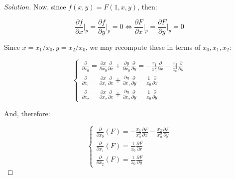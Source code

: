\documentclass[10pt]{article}
\begin{document}
\begin{proof}[Solution]





Now, since $f(x,y) = F(1,x,y)$, then:

$$ \frac{\partial f}{\partial x}\bigg|_{p}= \frac{\partial f}{\partial y}\bigg|_{p} = 0 \iff \frac{\partial F}{\partial x}\bigg|_{p}= \frac{\partial F}{\partial y}\bigg|_{p} = 0$$

Since $x = x_1/x_0, y = x_2/x_0$, we may recompute these in terms of $x_0,x_1, x_2$:

$$\begin{cases}\frac{\partial}{\partial x_0} =  \frac{\partial x}{\partial x_0}  \frac{\partial}{\partial x} +  \frac{\partial y}{\partial x_0}  \frac{\partial}{\partial y} = - \frac{x_1}{x_0^2} \frac{\partial}{\partial x} - \frac{x_2}{x_0^2} \frac{\partial}{\partial y} \\   \frac{\partial}{\partial x_1} =  \frac{\partial x}{\partial x_1}  \frac{\partial}{\partial x} +  \frac{\partial y}{\partial x_1}  \frac{\partial}{\partial y} = \frac{1}{x_0} \frac{\partial}{\partial x} \\ \frac{\partial}{\partial x_2} =  \frac{\partial x}{\partial x_2}  \frac{\partial}{\partial x} +  \frac{\partial y}{\partial x_2}  \frac{\partial}{\partial y} = \frac{1}{x_0}\frac{\partial}{\partial y} \end{cases}$$

And, therefore:

$$\begin{cases} \frac{\partial}{\partial x_0}(F) =  - \frac{x_1}{x_0^2} \frac{\partial F}{\partial x} - \frac{x_2}{x_0^2} \frac{\partial F}{\partial y} \\  \frac{\partial}{\partial x_1}(F) =  \frac{1}{x_0} \frac{\partial F}{\partial x} \\  \frac{\partial}{\partial x_2}(F) =  \frac{1}{x_0} \frac{\partial F}{\partial y} \end{cases} $$


\end{proof}
\end{document}
